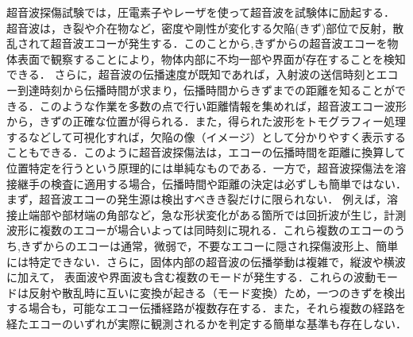 %
%
超音波探傷試験では，圧電素子やレーザを使って超音波を試験体に励起する．
超音波は，き裂や介在物など，密度や剛性が変化する欠陥(きず)部位で反射，散乱されて超音波エコーが発生する．このことから,きずからの超音波エコーを物体表面で観察することにより，物体内部に不均一部や界面が存在することを検知できる．
さらに，超音波の伝播速度が既知であれば，入射波の送信時刻とエコー到達時刻から伝播時間が求まり，伝播時間からきずまでの距離を知ることができる．このような作業を多数の点で行い距離情報を集めれば，超音波エコー波形から，きずの正確な位置が得られる．また，得られた波形をトモグラフィー処理するなどして可視化すれば，欠陥の像（イメージ）として分かりやすく表示することもできる．このように超音波探傷法は，エコーの伝播時間を距離に換算して位置特定を行うという原理的には単純なものである\cite{US}．一方で，超音波探傷法を溶接継手の検査に適用する場合，伝播時間や距離の決定は必ずしも簡単ではない．
まず，超音波エコーの発生源は検出すべきき裂だけに限られない．
例えば，溶接止端部や部材端の角部など，急な形状変化がある箇所では回折波が生じ，計測波形に複数のエコーが場合いよっては同時刻に現れる．これら複数のエコーのうち,きずからのエコーは通常，微弱で，不要なエコーに隠され探傷波形上、簡単には特定できない．さらに，固体内部の超音波の伝播挙動は複雑で，縦波や横波に加えて，
表面波や界面波も含む複数のモードが発生する\cite{JDA}．これらの波動モードは反射や散乱時に互いに変換が起きる（モード変換）ため，一つのきずを検出する場合も，可能なエコー伝播経路が複数存在する．また，それら複数の経路を経たエコーのいずれが実際に観測されるかを判定する簡単な基準も存在しない．\\

